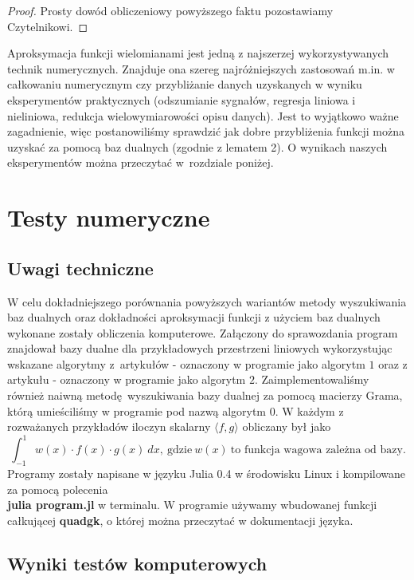 \documentclass{article}
\begin{document}
\begin{proof}
Prosty dowód obliczeniowy powyższego faktu pozostawiamy Czytelnikowi.	
\end{proof}

Aproksymacja funkcji wielomianami jest jedną z najszerzej wykorzystywanych technik numerycznych. Znajduje ona szereg najróżniejszych zastosowań m.in. w całkowaniu numerycznym czy przybliżanie danych uzyskanych w wyniku eksperymentów praktycznych (odszumianie sygnałów, regresja liniowa i nieliniowa, redukcja wielowymiarowości opisu danych). Jest to wyjątkowo ważne zagadnienie, więc postanowiliśmy sprawdzić jak dobre przybliżenia funkcji można uzyskać za pomocą baz dualnych (zgodnie z lematem 2). O wynikach naszych eksperymentów można przeczytać w~rozdziale poniżej.




\section{Testy numeryczne}

\subsection{Uwagi techniczne}

W celu dokładniejszego porównania powyższych wariantów metody wyszukiwania baz dualnych oraz dokładności aproksymacji funkcji z użyciem baz dualnych wykonane zostały obliczenia komputerowe. Załączony do sprawozdania program znajdował bazy dualne dla przykładowych przestrzeni liniowych wykorzystując wskazane algorytmy z~artykułów \cite{PWO1} - oznaczony w programie jako algorytm $1$ oraz z artykułu \cite{PWO2} - oznaczony w programie jako algorytm $2$. Zaimplementowaliśmy  również naiwną metodę wyszukiwania bazy dualnej za pomocą macierzy Grama, którą umieściliśmy w programie pod nazwą algorytm $0$. W każdym z rozważanych przykładów iloczyn skalarny $ \langle f, g \rangle $ obliczany był jako $$ \int_{-1}^{1} w(x) \cdot f(x) \cdot g(x) \ dx, \ \text{gdzie} \ w(x)  \ \text{to funkcja wagowa zależna od bazy}.$$ Programy zostały napisane w języku Julia 0.4 w środowisku Linux i kompilowane za pomocą polecenia \\ \textbf{julia program.jl} w terminalu. W programie używamy wbudowanej funkcji całkującej \textbf{quadgk}, o której można przeczytać w dokumentacji języka.		

\subsection{Wyniki testów komputerowych}
\end{document}
